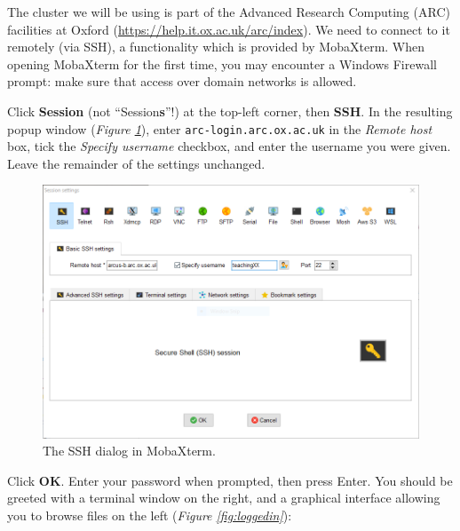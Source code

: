 \documentclass[10pt]{article}
\newcommand{\figref}[1]{\textit{Figure \ref{fig:#1}}}
\begin{document}
The cluster we will be using is part of the Advanced Research Computing (ARC) facilities at Oxford (\url{https://help.it.ox.ac.uk/arc/index}). We need to connect to it remotely (via SSH), a functionality which is provided by MobaXterm. When opening MobaXterm for the first time, you may encounter a Windows Firewall prompt: make sure that access over domain networks is allowed.

Click \textbf{Session} (not ``Session\textbf{s}''!) at the top-left corner, then \textbf{SSH}.  In the resulting popup window (\figref{ssh}), enter \texttt{arc-login.arc.ox.ac.uk} in the \textit{Remote host} box, tick the \textit{Specify username} checkbox, and enter the username you were given. Leave the remainder of the settings unchanged.

\begin{figure}[H]
    \centering
    \includegraphics[scale=0.5]{./img/ssh}
    \caption{The SSH dialog in MobaXterm.}
    \label{fig:ssh}
\end{figure}

Click \textbf{OK}. Enter your password when prompted, then press Enter. You should be greeted with a terminal window on the right, and a graphical interface allowing you to browse files on the left (\figref{loggedin}):
\end{document}

